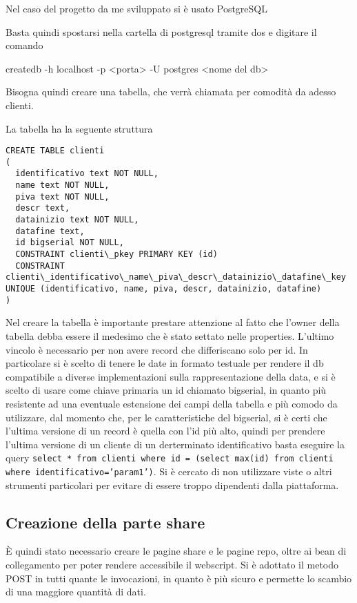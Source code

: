 Nel caso del progetto da me sviluppato si è usato PostgreSQL

Basta quindi spostarsi nella cartella di postgresql tramite dos e digitare il comando

createdb -h localhost -p <porta> -U postgres <nome del db>

Bisogna quindi creare una tabella, che verrà chiamata per comodità da adesso clienti.

La tabella ha la seguente struttura 
\begin{lstlisting}
CREATE TABLE clienti
(
  identificativo text NOT NULL,
  name text NOT NULL,
  piva text NOT NULL,
  descr text,
  datainizio text NOT NULL,
  datafine text,
  id bigserial NOT NULL,
  CONSTRAINT clienti\_pkey PRIMARY KEY (id)
  CONSTRAINT clienti\_identificativo\_name\_piva\_descr\_datainizio\_datafine\_key UNIQUE (identificativo, name, piva, descr, datainizio, datafine)
)
\end{lstlisting}
Nel creare la tabella è importante prestare attenzione al fatto che l'owner della tabella debba essere il medesimo che è stato settato nelle properties.
L’ultimo vincolo è necessario per non avere record che differiscano solo per id.
In particolare si è scelto di tenere le date in formato testuale per rendere il db compatibile a diverse implementazioni sulla rappresentazione della data, e si è scelto di usare come chiave primaria un id chiamato bigserial, in quanto più resistente ad una eventuale estensione dei campi della tabella e più comodo da utilizzare, dal momento che, per le caratteristiche del bigserial, si è certi che l’ultima versione di un record è quella con l’id più alto, quindi per prendere l’ultima versione di un cliente di un derterminato  identificativo basta eseguire la query \texttt{select * from clienti where id = (select max(id) from clienti where identificativo='param1')}. Si è cercato di non utilizzare viste o altri strumenti particolari per evitare di essere troppo dipendenti dalla piattaforma.



\subsection{Creazione della parte share}

È quindi stato necessario creare le pagine share e le pagine repo, oltre ai bean di collegamento per poter rendere accessibile il webscript. Si è adottato il metodo POST in tutti quante le invocazioni, in quanto è più sicuro e permette lo scambio di una maggiore quantità di dati.

